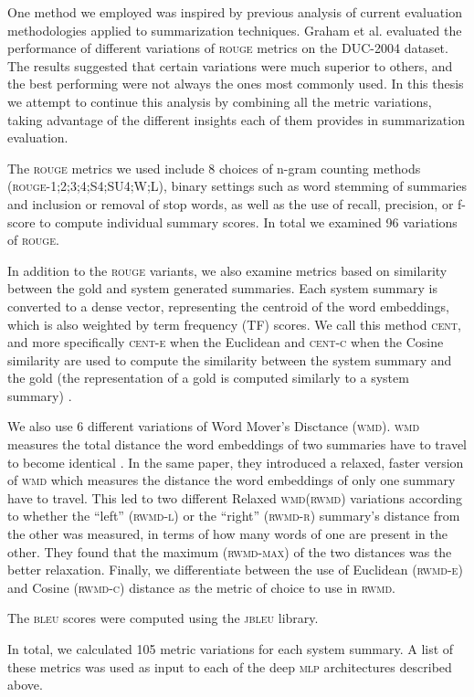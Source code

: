 \documentclass[11pt,a4paper]{article}
\newcommand{\rouge}{\textsc{rouge}\xspace}
\newcommand{\bleu}{\textsc{bleu}\xspace}
\newcommand{\jbleu}{\textsc{jbleu}\xspace}
\newcommand{\mlp}{\textsc{mlp}\xspace}
\newcommand{\cent}{\textsc{cent}\xspace}
\newcommand{\centc}{\textsc{cent-c}\xspace}
\newcommand{\cente}{\textsc{cent-e}\xspace}
\newcommand{\wmd}{\textsc{wmd}\xspace}
\newcommand{\rwmd}{\textsc{rwmd}\xspace}
\newcommand{\rwmdl}{\textsc{rwmd-l}\xspace}
\newcommand{\rwmdr}{\textsc{rwmd-r}\xspace}
\newcommand{\rwmdmax}{\textsc{rwmd-max}\xspace}
\newcommand{\rwmde}{\textsc{rwmd-e}\xspace}
\newcommand{\rwmdc}{\textsc{rwmd-c}\xspace}
\newcommand{\duc}{\textsc{DUC-2004}\xspace}
\begin{document}
One method we employed was inspired by previous analysis of current evaluation 
methodologies applied to summarization techniques. Graham et al. 
evaluated the performance of different variations of \rouge metrics on 
the \duc dataset. The results suggested that certain variations were much superior 
to others, and the best performing were not always the ones most commonly used. In 
this thesis we attempt to continue this analysis by combining all the metric variations, 
taking advantage of the different insights each of them provides in summarization evaluation.

The \rouge metrics we used include 8 choices of n-gram counting methods (\rouge-1;2;3;4;S4;SU4;W;L), 
binary settings such as word stemming of summaries and inclusion or removal of stop 
words, as well as the use of recall, precision, or f-score to compute individual 
summary scores. In total we examined 96 variations of \rouge.

In addition to the \rouge variants, we also examine metrics based on similarity between the 
gold and system generated summaries. Each system summary is converted to a dense vector, 
representing the centroid of the word embeddings, which is also weighted by term frequency 
(\textsc{TF}) scores. We call this method \cent, and more specifically \cente when the 
Euclidean and \centc when the Cosine similarity are used to compute the similarity between 
the system summary and the gold (the representation of a gold is computed similarly to a 
system summary) \cite{Brokos:2016}.

We also use 6 different variations of Word Mover's Disctance (\wmd). \wmd measures the total 
distance the word embeddings of two summaries have to travel to become identical \cite{Kusner:2015}. 
In the same paper, they introduced a relaxed, faster version of \wmd which measures the 
distance the word embeddings of only one summary have to travel. This led to two different 
Relaxed \wmd (\rwmd) variations according to whether the “left” (\rwmdl) or the “right” 
(\rwmdr) summary's distance from the other was measured, in terms of how many words of 
one are present in the other. They found that the maximum (\rwmdmax) of the two distances 
was the better relaxation. Finally, we differentiate between the use of Euclidean (\rwmde) 
and Cosine (\rwmdc) distance as the metric of choice to use in \rwmd.

The \bleu scores were computed using the \jbleu library.

In total, we calculated 105 metric variations for each system summary. A list of these metrics 
was used as input to each of the deep \mlp architectures described above.
\end{document}
